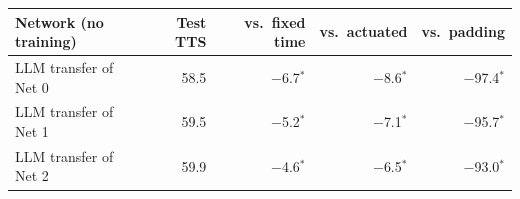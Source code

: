 \begin{tabular}{lrrrr}
\toprule
Network (no training) & Test TTS & vs.\ fixed time & vs.\ actuated & vs.\ padding \\
\midrule
LLM transfer of Net 0 & 58.5 & $-$6.7$^{*}$ & $-$8.6$^{*}$ & $-$97.4$^{*}$ \\
LLM transfer of Net 1 & 59.5 & $-$5.2$^{*}$ & $-$7.1$^{*}$ & $-$95.7$^{*}$ \\
LLM transfer of Net 2 & 59.9 & $-$4.6$^{*}$ & $-$6.5$^{*}$ & $-$93.0$^{*}$ \\
\bottomrule
\end{tabular}
